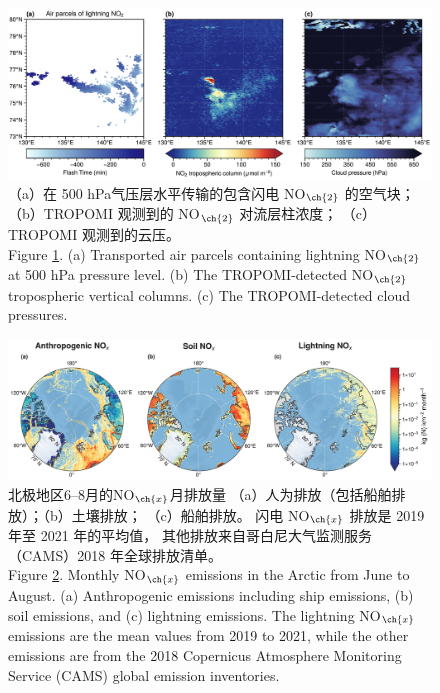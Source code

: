 \begin{landscape}
\vspace*{\fill}
\begin{figure}[H]
\centering
\includegraphics[width=0.9\columnwidth]{./figures/arctic_large_lno2.png}
\caption{
（a）在 500 hPa气压层水平传输的包含闪电 NO$_{\ch{2}}$ 的空气块；
（b）TROPOMI 观测到的 NO$_{\ch{2}}$ 对流层柱浓度；
（c）TROPOMI 观测到的云压。\\
Figure \ref{fig:arctic_large_lno2}. (a) Transported air parcels containing lightning NO$_{\ch{2}}$ at 500 hPa pressure level.
(b) The TROPOMI-detected NO$_{\ch{2}}$ tropospheric vertical columns.
(c) The TROPOMI-detected cloud pressures.
}
\label{fig:arctic_large_lno2}
\end{figure}
\vspace*{\fill}
\end{landscape}

\begin{landscape}
\vspace*{\fill}
\begin{figure}[H]
\centering
\includegraphics[width=0.9\columnwidth]{./figures/arctic_emission_comp.png}
\caption{
北极地区6--8月的NO$_{\ch{x}}$月排放量
（a）人为排放（包括船舶排放）；（b）土壤排放；
（c）船舶排放。
闪电 NO$_{\ch{x}}$ 排放是 2019 年至 2021 年的平均值，
其他排放来自哥白尼大气监测服务（CAMS）2018 年全球排放清单。\\
Figure \ref{fig:arctic_emission_comp}. Monthly NO$_{\ch{x}}$ emissions in the Arctic from June to August.
(a) Anthropogenic emissions including ship emissions, (b) soil emissions, and (c) lightning emissions.
The lightning NO$_{\ch{x}}$ emissions are the mean values from 2019 to 2021, while the other emissions are from the 2018 Copernicus Atmosphere Monitoring Service (CAMS) global emission inventories.
}
\label{fig:arctic_emission_comp}
\end{figure}
\vspace*{\fill}
\end{landscape}

